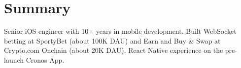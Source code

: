 \section{Summary}
Senior iOS engineer with 10+ years in mobile development. Built WebSocket betting at SportyBet (about 100K DAU) and Earn and Buy \& Swap at Crypto.com Onchain (about 20K DAU). React Native experience on the pre-launch Cronos App.
